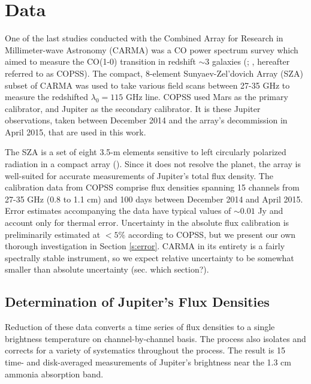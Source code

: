 \documentclass{article}
\begin{document}
\section{Data} \label{s:data}
	One of the last studies conducted with the Combined Array for Research in Millimeter-wave Astronomy (CARMA) was a CO power spectrum survey which aimed to measure the CO(1-0) transition in redshift $\sim 3$ galaxies (\citealt{2015ApJ...814..140K}; \citealt{2016ApJ...830...34K}, hereafter referred to as COPSS).
	The compact, 8-element Sunyaev-Zel'dovich Array (SZA) subset of CARMA was used to take various field scans between 27-35 GHz to measure the redshifted $\lambda_{0} = 115$ GHz line.
	COPSS used Mars as the primary calibrator, and Jupiter as the secondary calibrator.
	It is these Jupiter observations, taken between December 2014 and the array's decommission in April 2015, that are used in this work.

	The SZA is a set of eight 3.5-m elements sensitive to left circularly polarized radiation in a compact array (\citealt{2015ApJ...814..140K}).
	Since it does not resolve the planet, the array is well-suited for accurate measurements of Jupiter's total flux density.
	The calibration data from COPSS comprise flux densities spanning 15 channels from 27-35 GHz (0.8 to 1.1 cm) and 100 days between December 2014 and April 2015.
	Error estimates accompanying the data have typical values of $\sim0.01$ Jy and account only for thermal error.
	Uncertainty in the absolute flux calibration is preliminarily estimated at $<5\%$ according to COPSS, but we present our own thorough investigation in Section \ref{s:error}.
	CARMA in its entirety is a fairly spectrally stable instrument, so we expect relative uncertainty to be somewhat smaller than absolute uncertainty (sec. which section?).

\subsection{Determination of Jupiter's Flux Densities} \label{}
	Reduction of these data converts a time series of flux densities to a single brightness temperature on channel-by-channel basis.
	The process also isolates and corrects for a variety of systematics throughout the process.
	The result is 15 time- and disk-averaged measurements of Jupiter's brightness near the 1.3 cm ammonia absorption band.
\end{document}
